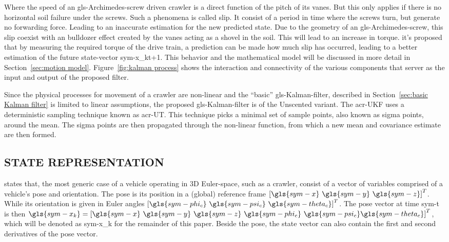 Where the speed of an  \gls{gls-Archimedes-screw} driven crawler is a direct function of the pitch of its vanes. But
this only applies if there is no horizontal soil failure under the screws. Such a phenomena is called slip. It consist
of a period in time where the screws turn, but generate no forwarding force. Leading to an inaccurate estimation for the
new predicted state. Due to the geometry of an \gls{gls-Archimedes-screw}, this slip coexist with an bulldozer effect
created by the vanes acting as a shovel in the soil. This will lead to an increase in torque. it's proposed that by
measuring the required torque of the drive train, a prediction can be made how much slip has occurred, leading to a
better estimation of the future state-vector \gls{sym-x_kt+1}. This behavior and the mathematical model will be
discussed in more detail in Section~\ref{sec:motion model}. Figure~\ref{fig:kalman process} shows the interaction and
connectivity of the various components that server as the input and output of the proposed filter.

Since the physical processes for movement of a crawler are non-linear and the ``basic'' \gls{gls-Kalman-filter},
described in Section~\ref{sec:basic Kalman filter} is limited to linear assumptions, the proposed
\gls{gls-Kalman-filter} is of the Unscented variant. The \gls{acr-UKF} uses a deterministic sampling technique
known as \gls{acr-UT}. This technique picks a minimal set of sample points, also known as sigma points, around
the mean. The sigma points are then propagated through the non-linear function, from which a new mean and covariance
estimate are then formed.

\subsection{STATE REPRESENTATION}\label{sec:state representation}

\citet{bahr_cooperative_2009} states that, the most generic case of a vehicle operating in 3D Euler-space, such as a
crawler, consist of a vector of variables comprised of a vehicle's pose and orientation. The pose is its position in a
(global) reference frame \( \left[\gls{sym-x} ~\gls{sym-y} ~\gls{sym-z}\right]^T \). While  its orientation is given in
Euler angles \( \left[\gls{sym-phi_c} ~\gls{sym-psi_c} ~\gls{sym-theta_c}\right]^T \). The pose vector at time
\gls{sym-t} is then \( \gls{sym-x_k} = \left[\gls{sym-x} ~\gls{sym-y} ~\gls{sym-z} ~\gls{sym-phi_c} ~\gls{sym-psi_c}
\gls{sym-theta_c}\right]^T \), which will be denoted as  \gls{sym-x_k} for the remainder of this paper. Beside the pose,
the state vector can also contain the first and second derivatives of the pose vector.

